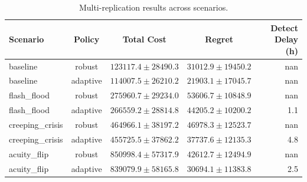 \begin{table}[htbp]
\centering
\caption{Multi-replication results across scenarios.}
\label{tab:multi_rep}
\begin{tabular}{lcccr}
\toprule
Scenario & Policy & Total Cost & Regret & Detect Delay (h) \\
\midrule
  baseline & robust & $123117.4 \pm 28490.3$ & $31012.9 \pm 19450.2$ & nan \\
  baseline & adaptive & $114007.5 \pm 26210.2$ & $21903.1 \pm 17045.7$ & nan \\
  flash_flood & robust & $275960.7 \pm 29234.0$ & $53606.7 \pm 10848.9$ & nan \\
  flash_flood & adaptive & $266559.2 \pm 28814.8$ & $44205.2 \pm 10200.2$ & 1.1 \\
  creeping_crisis & robust & $464966.1 \pm 38197.2$ & $46978.3 \pm 12523.7$ & nan \\
  creeping_crisis & adaptive & $455725.5 \pm 37862.2$ & $37737.6 \pm 12135.3$ & 4.8 \\
  acuity_flip & robust & $850998.4 \pm 57317.9$ & $42612.7 \pm 12494.9$ & nan \\
  acuity_flip & adaptive & $839079.9 \pm 58165.8$ & $30694.1 \pm 11383.8$ & 2.5 \\
\bottomrule
\end{tabular}
\end{table}